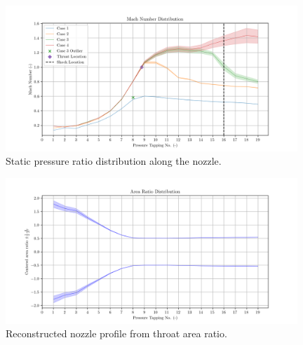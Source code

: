 \documentclass{article}
\begin{document}
\begin{figure}[H]
    \centering
    \includegraphics[width=0.98\textwidth]{../Supersonic_Nozzle/mach_number_distribution_corrected.png}
    \caption{Static pressure ratio distribution along the nozzle.}
    \label{fig:mach_distribution}
\end{figure}

\begin{figure}[H]
    \centering
    \includegraphics[width=0.98\textwidth]{../Supersonic_Nozzle/area_ratio_distribution.png}
    \caption{Reconstructed nozzle profile from throat area ratio.}
    \label{fig:area_distribution}
\end{figure}
\end{document}
